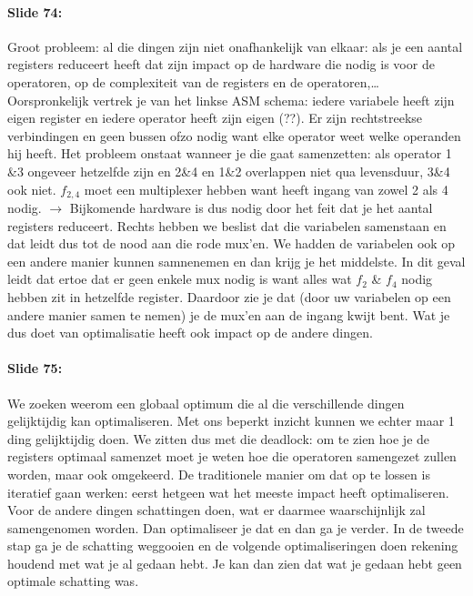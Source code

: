 \documentclass[10pt,a4paper]{book}
\begin{document}
\paragraph{Slide 74:} Groot probleem: al die dingen zijn niet onafhankelijk van elkaar: als je een aantal registers reduceert heeft dat zijn impact op de hardware die nodig is voor de operatoren, op de complexiteit van de registers en de operatoren,\ldots \\
Oorspronkelijk vertrek je van het linkse ASM schema: iedere variabele heeft zijn eigen register en iedere operator heeft zijn eigen (??). %
Er zijn rechtstreekse verbindingen en geen bussen ofzo nodig want elke operator weet welke operanden hij heeft. Het probleem onstaat wanneer je die gaat samenzetten: als operator 1 \&3 ongeveer hetzelfde zijn en 2\&4 en 1\&2 overlappen niet qua levensduur, 3\&4 ook niet. $f_{2,4}$  moet een multiplexer hebben want heeft ingang van zowel 2 als 4 nodig. $\rightarrow$ Bijkomende hardware is dus nodig door het feit dat je het aantal registers reduceert. Rechts hebben we beslist dat die variabelen samenstaan en dat leidt dus tot de nood aan die rode mux'en. We hadden de variabelen ook op een andere manier kunnen samnenemen en dan krijg je het middelste. In dit geval leidt dat ertoe dat er geen enkele mux nodig is want alles wat $f_2$ \& $f_4$ nodig hebben zit in hetzelfde register. Daardoor zie je dat (door uw variabelen op een andere manier samen te nemen) je de mux'en aan de ingang kwijt bent. Wat je dus doet van optimalisatie heeft ook impact op de andere dingen.

\paragraph{Slide 75:} We zoeken weerom een globaal optimum die al die verschillende dingen gelijktijdig kan optimaliseren. Met ons beperkt inzicht kunnen we echter maar 1 ding gelijktijdig doen. We zitten dus met die deadlock: om te zien hoe je de registers optimaal samenzet moet je weten hoe die operatoren samengezet zullen worden, maar ook omgekeerd. De traditionele manier om dat op te lossen is iteratief gaan werken: eerst hetgeen wat het meeste impact heeft optimaliseren. Voor de andere dingen schattingen doen, wat er daarmee waarschijnlijk zal samengenomen worden. Dan optimaliseer je dat en dan ga je verder. In de tweede stap ga je de schatting weggooien en de volgende optimaliseringen doen rekening houdend met wat je al gedaan hebt. Je kan dan zien dat wat je gedaan hebt geen optimale schatting was. 
\end{document}
